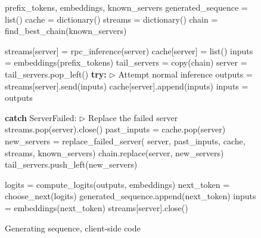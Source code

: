 \begin{figure*}[tb]
\begin{minipage}{0.56\textwidth}

\vspace{-10px}
\begin{algorithm}[H]
  \caption{Generating sequence, client-side code}
  \label{alg:main}
\begin{algorithmic}[1]
  \REQUIRE prefix\_tokens, embeddings, known\_servers
  \STATE generated\_sequence = list()
  \STATE cache = dictionary()
  \STATE streams = dictionary()
  \STATE chain = find\_best\_chain(known\_servers)

    
    \STATE streams[server] = {\color{blue}rpc\_inference}(server)
    \STATE cache[server] = list()
  \ENDFOR
  \STATE
  \STATE inputs = embeddings(prefix\_tokens)
    \STATE tail\_servers = copy(chain)
      \STATE server = tail\_servers.pop\_left()
      \STATE \textbf{try:}
      \STATE \hspace{16px} \(\triangleright\) Attempt normal inference
      \STATE \hspace{16px} outputs = streams[server].send(inputs)
      \STATE \hspace{16px} cache[server].append(inputs)
      \STATE \hspace{16px} inputs = outputs

      \STATE \textbf{catch} ServerFailed:
      \STATE \hspace{16px} \(\triangleright\) Replace the failed server
      \STATE \hspace{16px} streams.pop(server).close()
      \STATE \hspace{16px} past\_inputs = cache.pop(server)
      \STATE \hspace{16px} new\_servers = {\color{blue}replace\_failed\_server}(
      \STATE \hspace{16px} \hspace{16px} server, past\_inputs, cache, 
      \STATE \hspace{16px} \hspace{16px} streams, known\_servers)
      \STATE \hspace{16px} chain.replace(server, new\_servers)
      \STATE \hspace{16px} tail\_servers.push\_left(new\_servers)
      
    \ENDWHILE
    \STATE
    \STATE logits = compute\_logits(outputs, embeddings)
    \STATE next\_token = choose\_next(logits) 
    \STATE generated\_sequence.append(next\_token)
    \STATE inputs = embeddings(next\_token)
  \ENDWHILE
  \STATE
    \STATE streams[server].close()
  \ENDFOR


\end{algorithmic}
\end{algorithm}
\end{minipage}
\end{figure*}
